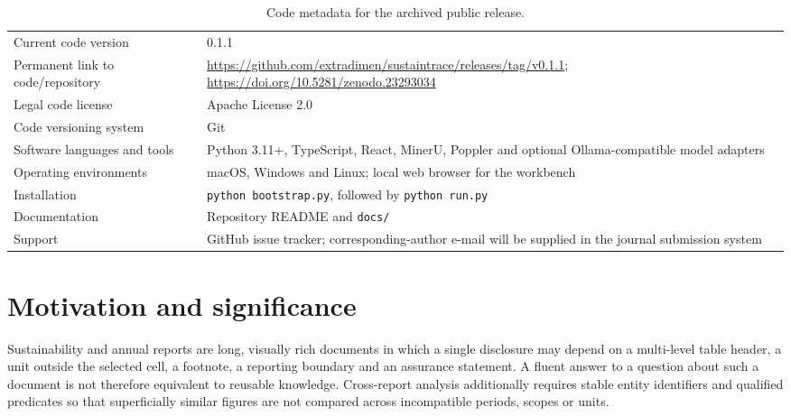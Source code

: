 \documentclass[a4paper,fleqn]{cas-sc}
\begin{document}
\maketitle

\begin{table}[t]
\caption{Code metadata for the archived public release.}
\label{tab:metadata}
\small
\renewcommand{\arraystretch}{1.08}
\begin{tabularx}{\textwidth}{@{}p{}X@{}}
\toprule
Current code version & 0.1.1 \\
Permanent link to code/repository & \url{https://github.com/extradimen/sustaintrace/releases/tag/v0.1.1}; \url{https://doi.org/10.5281/zenodo.23293034} \\
Legal code license & Apache License 2.0 \\
Code versioning system & Git \\
Software languages and tools & Python 3.11+, TypeScript, React, MinerU, Poppler and optional Ollama-compatible model adapters \\
Operating environments & macOS, Windows and Linux; local web browser for the workbench \\
Installation & \texttt{python bootstrap.py}, followed by \texttt{python run.py} \\
Documentation & Repository README and \texttt{docs/} \\
Support & GitHub issue tracker; corresponding-author e-mail will be supplied in the journal submission system \\
\bottomrule
\end{tabularx}
\end{table}

\section{Motivation and significance}\label{sec:motivation}

Sustainability and annual reports are long, visually rich documents in which a single disclosure
may depend on a multi-level table header, a unit outside the selected cell, a footnote, a reporting
boundary and an assurance statement. A fluent answer to a question about such a document is not
therefore equivalent to reusable knowledge. Cross-report analysis additionally requires stable
entity identifiers and qualified predicates so that superficially similar figures are not compared
across incompatible periods, scopes or units.
\end{document}
